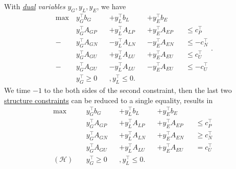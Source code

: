 With \emph{\hyperref[def:dual]{dual} variables} \(y_G, y_L, y_E\), we have
\[
	\begin{alignedat}{4}
		\max~ & y^{\top}_G b_G    &  & + y^{\top}_L b_L    &  & + y^{\top}_E b_E                          \\
		      & y^{\top}_G A_{GP} &  & + y^{\top}_L A_{LP} &  & + y^{\top}_E A_{EP} &  & \leq c^{\top}_P  \\
		-     & y^{\top}_G A_{GN} &  & - y^{\top}_L A_{LN} &  & - y^{\top}_E A_{EN} &  & \leq -c^{\top}_N \\
		      & y^{\top}_G A_{GU} &  & + y^{\top}_L A_{LU} &  & + y^{\top}_E A_{EU} &  & \leq c^{\top}_U  \\
		-     & y^{\top}_G A_{GU} &  & - y^{\top}_L A_{LU} &  & - y^{\top}_E A_{EU} &  & \leq -c^{\top}_U \\
		      & y^{\top}_G \geq 0 &  & , y^{\top}_L\leq 0.
	\end{alignedat}.
\]
We time \(-1\) to the both sides of the second constraint, then the last two \hyperref[def:structured-constraint]{structure constraints} can be reduced to a single equality, results in
\[
	\begin{alignedat}{4}
		\max~              & y^{\top}_G b_G    &  & + y^{\top}_L b_L    &  & + y^{\top}_E b_E                         \\
		                   & y^{\top}_G A_{GP} &  & + y^{\top}_L A_{LP} &  & + y^{\top}_E A_{EP} &  & \leq c^{\top}_P \\
		                   & y^{\top}_G A_{GN} &  & + y^{\top}_L A_{LN} &  & + y^{\top}_E A_{EN} &  & \geq c^{\top}_N \\
		                   & y^{\top}_G A_{GU} &  & + y^{\top}_L A_{LU} &  & + y^{\top}_E A_{EU} &  & = c^{\top}_U    \\
		(\mathcal{H})\quad & y^{\top}_G \geq 0 &  & , y^{\top}_L\leq 0.
	\end{alignedat}
\]

